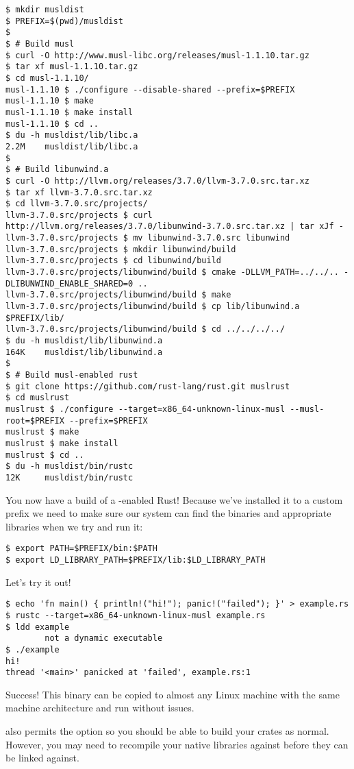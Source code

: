 \begin{verbatim}
$ mkdir musldist
$ PREFIX=$(pwd)/musldist
$
$ # Build musl
$ curl -O http://www.musl-libc.org/releases/musl-1.1.10.tar.gz
$ tar xf musl-1.1.10.tar.gz
$ cd musl-1.1.10/
musl-1.1.10 $ ./configure --disable-shared --prefix=$PREFIX
musl-1.1.10 $ make
musl-1.1.10 $ make install
musl-1.1.10 $ cd ..
$ du -h musldist/lib/libc.a
2.2M    musldist/lib/libc.a
$
$ # Build libunwind.a
$ curl -O http://llvm.org/releases/3.7.0/llvm-3.7.0.src.tar.xz
$ tar xf llvm-3.7.0.src.tar.xz
$ cd llvm-3.7.0.src/projects/
llvm-3.7.0.src/projects $ curl http://llvm.org/releases/3.7.0/libunwind-3.7.0.src.tar.xz | tar xJf -
llvm-3.7.0.src/projects $ mv libunwind-3.7.0.src libunwind
llvm-3.7.0.src/projects $ mkdir libunwind/build
llvm-3.7.0.src/projects $ cd libunwind/build
llvm-3.7.0.src/projects/libunwind/build $ cmake -DLLVM_PATH=../../.. -DLIBUNWIND_ENABLE_SHARED=0 ..
llvm-3.7.0.src/projects/libunwind/build $ make
llvm-3.7.0.src/projects/libunwind/build $ cp lib/libunwind.a $PREFIX/lib/
llvm-3.7.0.src/projects/libunwind/build $ cd ../../../../
$ du -h musldist/lib/libunwind.a
164K    musldist/lib/libunwind.a
$
$ # Build musl-enabled rust
$ git clone https://github.com/rust-lang/rust.git muslrust
$ cd muslrust
muslrust $ ./configure --target=x86_64-unknown-linux-musl --musl-root=$PREFIX --prefix=$PREFIX
muslrust $ make
muslrust $ make install
muslrust $ cd ..
$ du -h musldist/bin/rustc
12K     musldist/bin/rustc
\end{verbatim}

You now have a build of a -enabled Rust! Because we've installed it to a custom prefix we need to make sure 
our system can find the binaries and appropriate libraries when we try and run it:

\begin{verbatim}
$ export PATH=$PREFIX/bin:$PATH
$ export LD_LIBRARY_PATH=$PREFIX/lib:$LD_LIBRARY_PATH
\end{verbatim}

Let's try it out!

\begin{verbatim}
$ echo 'fn main() { println!("hi!"); panic!("failed"); }' > example.rs
$ rustc --target=x86_64-unknown-linux-musl example.rs
$ ldd example
        not a dynamic executable
$ ./example
hi!
thread '<main>' panicked at 'failed', example.rs:1
\end{verbatim}

Success! This binary can be copied to almost any Linux machine with the same machine architecture and run without issues.

\blank

 also permits the  option so you should be able to build your crates as normal. However, you 
may need to recompile your native libraries against  before they can be linked against.
